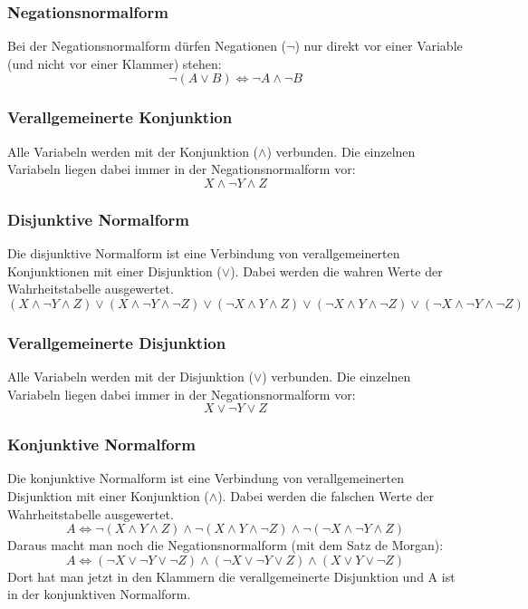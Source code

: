 \subsubsection{Negationsnormalform}
  Bei der Negationsnormalform dürfen Negationen ($\neg$) nur direkt vor
  einer Variable (und nicht vor einer Klammer) stehen:
  \[\neg (A \vee B) \Leftrightarrow \neg A \wedge \neg B\]
\subsubsection{Verallgemeinerte Konjunktion}
  Alle Variabeln werden mit der Konjunktion ($\wedge$) verbunden.
  Die einzelnen Variabeln liegen dabei immer in der Negationsnormalform vor:
  \[ X \wedge \neg Y \wedge Z\]
\subsubsection{Disjunktive Normalform}
  Die disjunktive Normalform ist eine Verbindung von verallgemeinerten
  Konjunktionen mit einer Disjunktion ($\vee$).
  Dabei werden die wahren Werte der Wahrheitstabelle ausgewertet.
  \[ (X \wedge \neg Y \wedge Z) \vee (X \wedge \neg Y \wedge \neg Z) \vee (\neg X \wedge Y \wedge Z)
    \vee (\neg X \wedge Y \wedge \neg Z) \vee (\neg X \wedge \neg Y \wedge \neg Z)\]
\subsubsection{Verallgemeinerte Disjunktion}
  Alle Variabeln werden mit der Disjunktion ($\vee$) verbunden. 
  Die einzelnen Variabeln liegen dabei immer in der Negationsnormalform vor:
  \[ X \vee \neg Y \vee Z\]
\subsubsection{Konjunktive Normalform}
  Die konjunktive Normalform ist eine Verbindung von verallgemeinerten Disjunktion
  mit einer Konjunktion ($\wedge$).  Dabei werden die falschen Werte
  der Wahrheitstabelle ausgewertet.
  \[ A \Leftrightarrow \neg(X \wedge Y \wedge Z) \wedge \neg(X \wedge Y \wedge \neg Z) \wedge \neg(\neg X \wedge \neg Y \wedge Z) \]
  Daraus macht man noch die Negationsnormalform (mit dem Satz de Morgan):
  \[ A \Leftrightarrow (\neg X \vee \neg Y \vee \neg Z) \wedge (\neg X \vee \neg Y \vee Z) \wedge (X \vee Y \vee \neg Z) \]
  Dort hat man jetzt in den Klammern die verallgemeinerte Disjunktion und A ist in der konjunktiven Normalform.

